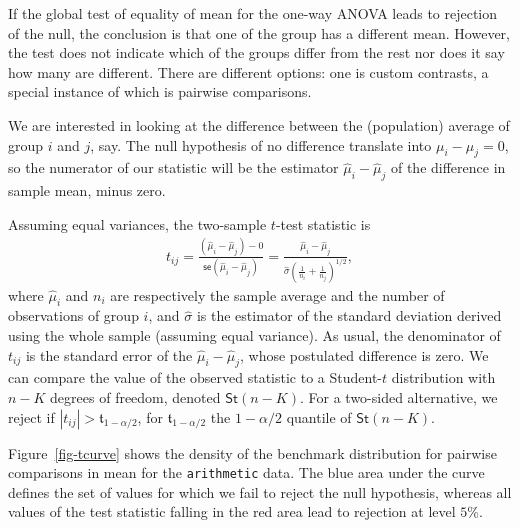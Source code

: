 \documentclass[
  11pt,
  letterpaper,
]{scrbook}
\theoremstyle{definition}
\theoremstyle{definition}
\theoremstyle{remark}
\begin{document}
If the global test of equality of mean for the one-way ANOVA leads to
rejection of the null, the conclusion is that one of the group has a
different mean. However, the test does not indicate which of the groups
differ from the rest nor does it say how many are different. There are
different options: one is custom contrasts, a special instance of which
is pairwise comparisons.

We are interested in looking at the difference between the (population)
average of group \(i\) and \(j\), say. The null hypothesis of no
difference translate into \(\mu_i-\mu_j=0\), so the numerator of our
statistic will be the estimator \(\widehat{\mu}_i - \widehat{\mu}_j\) of
the difference in sample mean, minus zero.

Assuming equal variances, the two-sample \(t\)-test statistic is
\begin{align*}
t_{ij} = \frac{(\widehat{\mu}_i - \widehat{\mu}_j) - 0}{\mathsf{se}(\widehat{\mu}_i - \widehat{\mu}_j)} =\frac{\widehat{\mu}_i - \widehat{\mu}_j}{\widehat{\sigma} \left(\frac{1}{n_i} + \frac{1}{n_j}\right)^{1/2}},
\end{align*} where \(\widehat{\mu}_i\) and \(n_i\) are respectively the
sample average and the number of observations of group \(i\), and
\(\widehat{\sigma}\) is the estimator of the standard deviation derived
using the whole sample (assuming equal variance). As usual, the
denominator of \(t_{ij}\) is the standard error of the
\(\widehat{\mu}_i - \widehat{\mu}_j\), whose postulated difference is
zero. We can compare the value of the observed statistic to a
Student-\(t\) distribution with \(n-K\) degrees of freedom, denoted
\(\mathsf{St}(n-K)\). For a two-sided alternative, we reject if
\(|t_{ij}| > \mathfrak{t}_{1-\alpha/2}\), for
\(\mathfrak{t}_{1-\alpha/2}\) the \(1-\alpha/2\) quantile of
\(\mathsf{St}(n-K)\).

Figure~\ref{fig-tcurve} shows the density of the benchmark distribution
for pairwise comparisons in mean for the \texttt{arithmetic} data. The
blue area under the curve defines the set of values for which we fail to
reject the null hypothesis, whereas all values of the test statistic
falling in the red area lead to rejection at level \(5\)\%.
\end{document}
